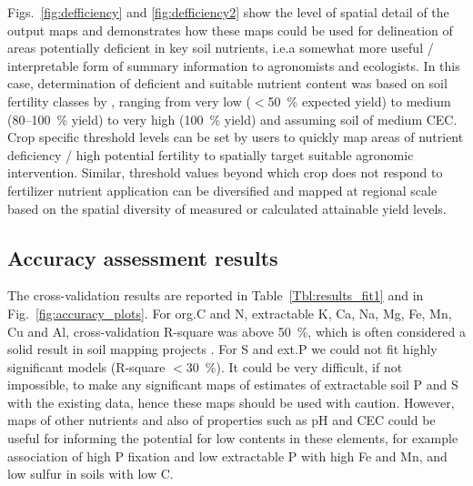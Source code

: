 \begin{linenumbers}
Figs.\@~\ref{fig:defficiency} and \ref{fig:defficiency2} show the level of spatial detail of the output maps and demonstrates how  these maps could be used for delineation of areas potentially deficient in key soil nutrients, i.e.\@ a somewhat more useful / interpretable form of summary information to agronomists and ecologists. In this case, determination of deficient and suitable nutrient content was based on soil fertility classes by \citet{roy2006plant}, ranging from very low ($<$\SI{50}{\percent} expected yield) to medium (80--\SI{100}{\percent} yield) to very high (\SI{100}{\percent} yield) and assuming soil of medium CEC. Crop specific threshold levels can be set by users to quickly map areas of nutrient deficiency / high potential fertility to spatially target suitable agronomic intervention. Similar, threshold values beyond which crop does not respond to fertilizer nutrient application can be diversified and mapped at regional scale based on the spatial diversity of measured or calculated attainable yield levels.  \par

\subsection{Accuracy assessment results}

The cross-validation results are reported in Table~\ref{Tbl:results_fit1} and in Fig.\@~\ref{fig:accuracy_plots}. For org.\@ C and N, extractable K, Ca, Na, Mg, Fe, Mn, Cu and Al, cross-validation R-square was above \SI{50}{\percent}, which is often considered a solid result in soil mapping projects \citep{Hengl2015AfSoilGrids250m}. For S and ext.\@ P we could not fit highly significant models (R-square $<$\SI{30}{\percent}). It could be very difficult, if not impossible, to make any significant maps of estimates of extractable soil P and S with the existing data, hence these maps should be used with caution. However, maps of other nutrients and also of properties such as pH and CEC could be useful for informing the potential for low contents in these elements, for example association of high P fixation and low extractable P with high Fe and Mn, and low sulfur in soils with low C.\par

\clearpage


\end{linenumbers}
